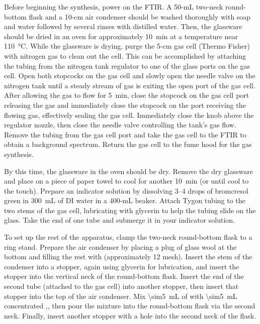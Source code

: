 \documentclass[nobib,nofonts,nols,nohyper]{tufte-handout}
\begin{document}
Before beginning the synthesis, power on the FTIR. 
A 50-mL two-neck round-bottom flask and a 10-cm air condenser should be washed thoroughly with soap and water followed by several rinses with distilled water. 
Then, the glassware  should be dried in an oven for approximately \SI{10}{\minute} at a temperature near \SI{110}{\celsius}. 
While the glassware is drying, purge the 5-cm gas cell (Thermo Fisher) with nitrogen gas to clean out the cell.
This can be accomplished by attaching the tubing from the nitrogen tank regulator to one of the glass ports on the gas cell. 
Open both stopcocks on the gas cell and slowly open the needle valve on the nitrogen tank until a steady stream of gas is exiting the open port of the gas cell. 
After allowing the gas to flow for \SI{5}{\minute}, close the stopcock on the gas cell port releasing the gas and immediately close the stopcock on the port receiving the flowing gas, effectively sealing the gas cell. 
Immediately close the knob above the regulator nozzle, then close the needle valve controlling the tank's gas flow. 
Remove the tubing from the gas cell port and take the gas cell to the FTIR to obtain a background spectrum. 
Return the gas cell to the fume hood for the gas synthesis. 

By this time, the glassware in the oven should be dry. Remove the dry glassware and place on a piece of paper towel to cool for another \SI{10}{\minute} (or until cool to the touch). 
Prepare an indicator solution by dissolving \numrange{3}{4} drops of bromcresol green in \SI{300}{\mL} of DI water in a 400-mL beaker. 
Attach Tygon tubing to the two stems of the gas cell, lubricating with glycerin to help the tubing slide on the glass. 
Take the end of one tube and submerge it in your indicator solution. 

To set up the rest of the apparatus, clamp the two-neck round-bottom flask to a ring stand. 
Prepare the air condenser by placing a plug of glass wool at the bottom and filling the rest with  (approximately 12 mesh). 
Insert the stem of the condenser into a stopper, again using glycerin for lubrication, and insert the stopper into the vertical neck of the round-bottom flask. 
Insert the end of the second tube (attached to the gas cell) into another stopper, then insert that stopper into the top of the air condenser. 
Mix \SI{\sim5}{\mL} of  with \SI{\sim5}{\mL} concentrated ,, then pour the mixture into the round-bottom flask via the second neck. 
Finally, insert another stopper with a hole into the second neck of the flask. 
\end{document}

